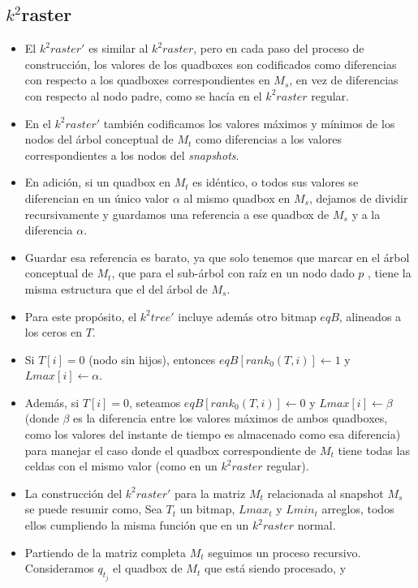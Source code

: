 \documentclass{article}
\begin{document}
    \subsection*{$k^2 $raster}
\begin{itemize}
  \item El $k^2raster'$ es similar al $k^2raster$, pero en cada paso del
    proceso de construcción, los valores de los quadboxes son codificados como
    diferencias con respecto a los quadboxes correspondientes en $M_s$, en vez
    de diferencias con respecto al nodo padre, como se hacía en el $k^2raster$
    regular.
  \item En el $k^2raster'$ también codificamos los valores máximos y mínimos
    de los nodos del árbol conceptual de $M_t$ como diferencias a los valores
    correspondientes a los nodos del \emph{snapshots}.
  \item En adición, si un quadbox en $M_t$ es idéntico, o todos sus valores se
    diferencian en un único valor $\alpha$ al mismo quadbox en $M_s$, dejamos
    de dividir recursivamente y guardamos una referencia a ese quadbox de
    $M_s$ y a la diferencia $\alpha$.
  \item Guardar esa referencia es barato, ya que solo tenemos que marcar en el
    árbol conceptual de $M_t$, que para el sub-árbol con raíz en un nodo dado $p$
    , tiene la misma estructura que el del árbol de $M_s$.
  \item Para este propósito, el $k^2tree'$ incluye además otro bitmap $eqB$,
    alineados a los ceros en $T$.
  \item Si $T[i] = 0$ (nodo sin hijos), entonces  $eqB[rank_0(T,i)] \gets 1$ y
    $Lmax[i] \gets \alpha$.
  \item Además, si $T[i] = 0 $, seteamos $eqB[rank_0(T,i)] \gets 0$ y
    $Lmax[i] \gets \beta$ (donde $\beta$ es la diferencia entre los valores
    máximos de ambos quadboxes, como los valores del instante de tiempo es
    almacenado como esa diferencia) para manejar el caso donde el quadbox
    correspondiente de $M_t$ tiene todas las celdas con el mismo valor (como en
    un $k^2raster$ regular).
  \item La construcción del $k^2raster'$ para la matriz $M_t$ relacionada al
    snapshot $M_s$ se puede resumir como, Sea $T_t$ un bitmap, $Lmax_t$ y
    $Lmin_t$ arreglos, todos ellos cumpliendo la misma función que en un
    $k^2raster$ normal.
  \item Partiendo de la matriz completa $M_t$ seguimos un proceso recursivo.
    Consideramos $q_t_j$ el quadbox de $M_t$ que está siendo procesado, y

\end{itemize}
\end{document}
